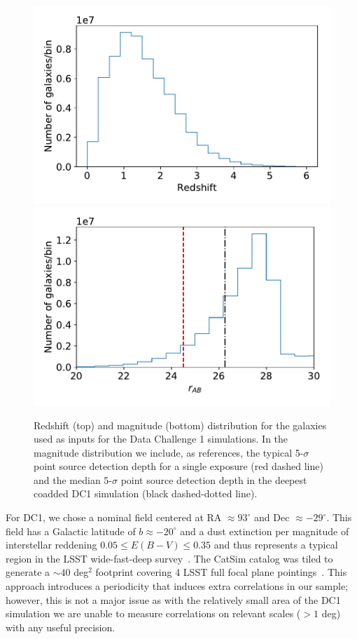 \documentclass[\docopts]{\docclass}
\begin{document}
\begin{figure}
\centering
\includegraphics[width=0.9\columnwidth]{N_z_DC1.pdf}
\includegraphics[width=0.9\columnwidth]{N_m_DC1.pdf}
\caption{Redshift (top) and magnitude (bottom) distribution for the galaxies used as inputs for the Data Challenge 1 simulations. In the magnitude distribution we include, as references, the typical 5-$\sigma$ point source detection depth for a single exposure (red dashed line) and the median 5-$\sigma$ point source detection depth in the deepest coadded DC1 simulation (black dashed-dotted line).}
\label{fig:catalog_plots}
\end{figure}


For DC1, we chose a nominal field centered at RA $\approx 93^{\circ}$ and Dec $\approx -29^{\circ}$. This field has a Galactic latitude of $b \approx -20^{\circ}$ and a dust extinction per magnitude of interstellar reddening $0.05 \leq E(B-V) \leq 0.35$ and thus represents a typical region in the LSST wide-fast-deep survey~\citep{Overview}. The CatSim catalog was tiled to generate a $\sim 40$ deg$^{2}$ footprint covering 4 LSST full focal plane pointings~. This approach introduces a periodicity that induces extra correlations in our sample; however, this is not a major issue as with the relatively small area of the DC1 simulation we are unable to measure correlations on relevant scales ($> 1$ deg) with any useful precision.
\end{document}
